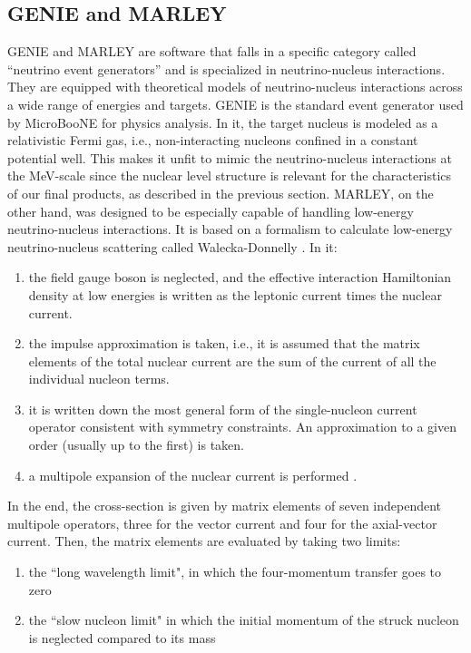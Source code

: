 \subsection{GENIE and MARLEY}
GENIE and MARLEY are software that falls in a specific category called ``neutrino event generators” and is specialized in neutrino-nucleus interactions. They are equipped with theoretical models of neutrino-nucleus interactions across a wide range of energies and targets. 
GENIE is the standard event generator used by MicroBooNE for physics analysis. In it, the target nucleus is modeled as a relativistic Fermi gas, i.e., non-interacting nucleons confined in a constant potential well. This makes it unfit to mimic the neutrino-nucleus interactions at the MeV-scale since the nuclear level structure is relevant for the characteristics of our final products, as described in the previous section. 
MARLEY, on the other hand, was designed to be especially capable of handling low-energy neutrino-nucleus interactions. It is based on a formalism to calculate low-energy neutrino-nucleus scattering called Walecka-Donnelly \cite{Walecka-Donnelly}. In it:
\begin{enumerate}
 \item the field gauge boson is neglected, and the effective interaction Hamiltonian density at low energies is written as the leptonic current times the nuclear current.
 \item the impulse approximation is taken, i.e., it is assumed that the matrix elements of the total nuclear current are the sum of the current of all the individual nucleon terms.
 \item it is written down the most general form of the single-nucleon current operator consistent with symmetry constraints. An approximation to a given order (usually up to the first) is taken.
 \item a multipole expansion of the nuclear current is performed \cite{Gardiner_thesis}. 
\end{enumerate}

In the end, the cross-section is given by matrix elements of seven independent multipole operators, three for the vector current and four for the axial-vector current. 
Then, the matrix elements are evaluated by taking two limits: 
\begin{enumerate}
 \item the ``long wavelength limit", in which the four-momentum transfer goes to zero
 \item the ``slow nucleon limit" in which the initial momentum of the struck nucleon is neglected compared to its mass
\end{enumerate}


